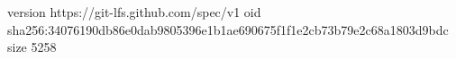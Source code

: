 version https://git-lfs.github.com/spec/v1
oid sha256:34076190db86e0dab9805396e1b1ae690675f1f1e2cb73b79e2c68a1803d9bdc
size 5258
